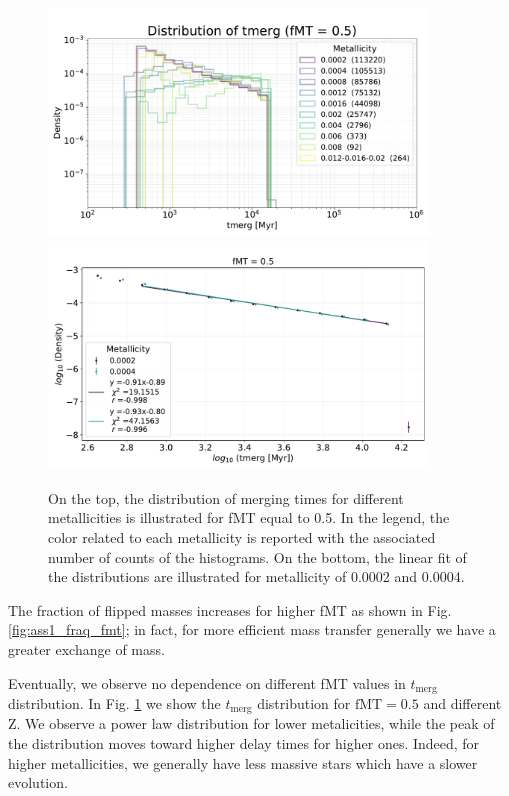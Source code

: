 \documentclass[prb,twocolumn,9pt]{revtex4-1}
\begin{document}
\begin{figure}[htp]
    \begin{minipage}[l]{1.0\columnwidth}
    \centering
    \includegraphics[width=0.9\textwidth]{images/assignment1/hist_time_tmerg.pdf} \\
     \includegraphics[width=0.9\textwidth]{images/assignment1/fit_hist_time_tmerg.pdf}
    \end{minipage}
    \caption{On the top, the distribution of merging times for different metallicities is illustrated for  fMT equal to 0.5. In the legend, the color related to each metallicity is reported  with the associated number of counts of the histograms. On the bottom, the linear fit of the distributions are illustrated for metallicity of 0.0002 and 0.0004.}
    \label{fig:ass1_tmerg}
\end{figure}

The fraction of flipped masses increases for higher fMT as shown in Fig. \ref{fig:ass1_fraq_fmt}; in fact, for more efficient mass transfer generally we have a greater exchange of mass.

Eventually, we observe no dependence on different fMT values in \(t_\text{merg}\) distribution. In Fig. \ref{fig:ass1_tmerg} we show the \(t_\text{merg}\) distribution for \( \text{fMT} = 0.5\) and different Z. We observe a power law distribution for lower metalicities, while the peak of the distribution moves toward higher delay times for higher ones. Indeed, for higher metallicities, we generally have less massive stars which have a slower evolution.
\end{document}
